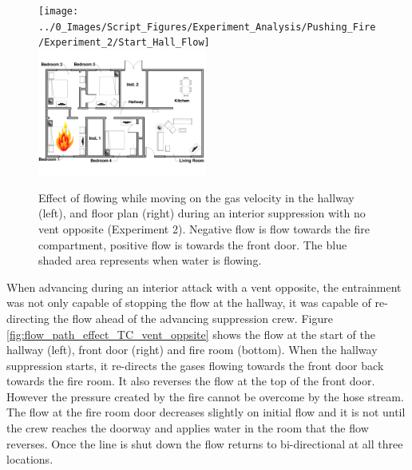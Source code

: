 \documentclass[12pt,oneside]{book}
\begin{document}
\begin{figure}[H]
\centering
\texttt{[image: ../0\_Images/Script\_Figures/Experiment\_Analysis/Pushing\_Fire/Experiment\_2/Start\_Hall\_Flow]}
\includegraphics[width=0.495\textwidth]{../0_Images/Tactical_Considerations/Flow_Path_Effect/No_Vent_Clean}
\caption[Hallway Flow - Flow \& Move Interior Attack]{Effect of flowing while moving on the gas velocity in the hallway (left), and floor plan (right) during an interior suppression with no vent opposite (Experiment 2). Negative flow is flow towards the fire compartment, positive flow is towards the front door. The blue shaded area represents when water is flowing.}
\label{fig:flow_path_effect_TC_hallwayflow}
\end{figure}

When advancing during an interior attack with a vent opposite, the entrainment was not only capable of stopping the flow at the hallway, it was capable of re-directing the flow ahead of the advancing suppression crew. Figure \ref{fig:flow_path_effect_TC_vent_oppsite} shows the flow at the start of the hallway (left), front door (right) and fire room (bottom). When the hallway suppression starts, it re-directs the gases flowing towards the front door back towards the fire room. It also reverses the flow at the top of the front door. However the pressure created by the fire cannot be overcome by the hose stream. The flow at the fire room door decreases slightly on initial flow and it is not until the crew reaches the doorway and applies water in the room that the flow reverses. Once the line is shut down the flow returns to bi-directional at all three locations. 
\end{document}
